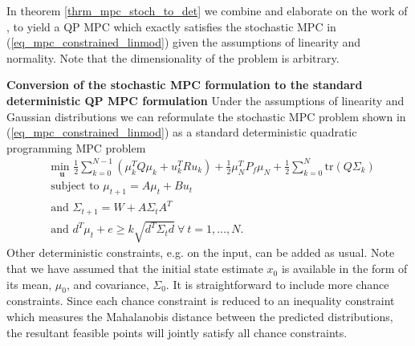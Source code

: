 In theorem \ref{thrm_mpc_stoch_to_det} we combine and elaborate on the work of \cite{yan1}, \cite{vanhessem1} to yield a QP MPC which exactly satisfies the stochastic MPC in (\ref{eq_mpc_constrained_linmod}) given the assumptions of linearity and normality. Note that the dimensionality of the problem is arbitrary.
\begin{thrm}
\textbf{Conversion of the stochastic MPC formulation to the standard deterministic QP MPC formulation} Under the assumptions of linearity and Gaussian distributions we can reformulate the stochastic MPC problem shown in (\ref{eq_mpc_constrained_linmod}) as a standard deterministic quadratic programming MPC problem
\begin{equation}
\begin{aligned}
&\underset{\mathbf{u}}{\text{min }} \frac{1}{2}\sum_{k=0}^{N-1} \left( \mu_k^TQ\mu_k + u_k^TRu_k \right) + \frac{1}{2}\mu_N^TP_f\mu_N + \frac{1}{2}\sum_{k=0}^N \text{tr}(Q\Sigma_k) \\
& \text{subject to } \mu_{t+1}=A\mu_t + Bu_t \\
& \text{and } \Sigma_{t+1} = W+A\Sigma_t A^T \\
& \text{and } d^T\mu_t + e \geq k\sqrt{d^T \Sigma_t d} ~\forall ~t=1,\hdots,N.
\end{aligned}
\label{eq_mpc_constrained_linmod_deter}
\end{equation}
\label{thrm_mpc_stoch_to_det}
Other deterministic constraints, e.g. on the input, can be added as usual. Note that we have assumed that the initial state estimate $x_0$ is available in the form of its mean, $\mu_0$,  and covariance, $\Sigma_0$. It is straightforward to include more chance constraints. Since each chance constraint is reduced to an inequality constraint which measures the Mahalanobis distance between the predicted distributions, the resultant feasible points will jointly satisfy all chance constraints.  
\end{thrm}
